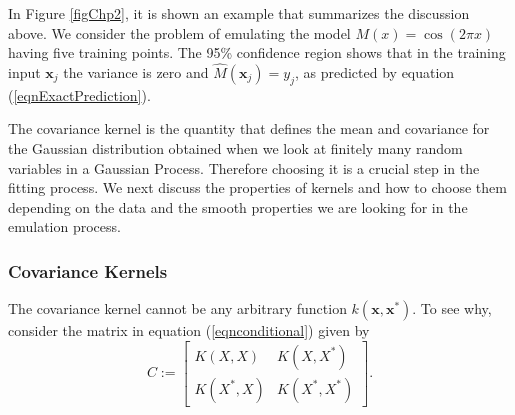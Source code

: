 \documentclass[12pt]{book}
\newcommand{\x}{\textbf{x}}
\begin{document}
In Figure \ref{figChp2}, it is shown an example that summarizes the discussion above.
We consider the problem of emulating the model $M(x)=\cos(2\pi x)$
having five training points. The 95\% confidence region
shows that in the training input $\x_{j}$  the variance is zero  and $\widehat{M}(\x_{j})=y_{j}$, 
as predicted by equation (\ref{eqnExactPrediction}).
\newline

The covariance kernel is the quantity that defines the mean and covariance for
the Gaussian distribution obtained when we look at finitely many random variables in 
a Gaussian Process. Therefore choosing it
is a crucial step in the fitting process. We next discuss the properties
of kernels and how to choose them depending on the data and the smooth properties we are looking
for in the emulation process. 

\subsubsection*{Covariance Kernels}
The covariance kernel cannot be any arbitrary function $k(\x,\x^{*})$. To see why, consider  the
matrix in  equation (\ref{eqnconditional}) given by
\begin{equation*}
C:=\begin{bmatrix} K(X,X) & K(X,X^{*}) \\
 K(X^{*},X) & K(X^{*},X^{*}) \end{bmatrix}.
\end{equation*}
\end{document}

